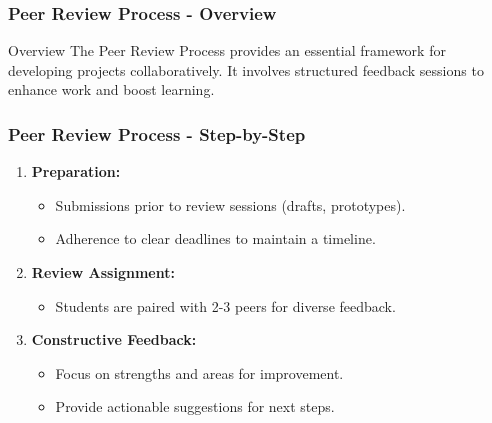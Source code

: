 \documentclass[aspectratio=169]{beamer}
\begin{document}
\begin{frame}[fragile]
    \frametitle{Peer Review Process - Overview}
    \begin{block}{Overview}
        The Peer Review Process provides an essential framework for developing projects collaboratively. 
        It involves structured feedback sessions to enhance work and boost learning.
    \end{block}
\end{frame}

\begin{frame}[fragile]
    \frametitle{Peer Review Process - Step-by-Step}
    \begin{enumerate}
        \item \textbf{Preparation:}
        \begin{itemize}
            \item Submissions prior to review sessions (drafts, prototypes).
            \item Adherence to clear deadlines to maintain a timeline.
        \end{itemize}
        
        \item \textbf{Review Assignment:}
        \begin{itemize}
            \item Students are paired with 2-3 peers for diverse feedback.
        \end{itemize}
        
        \item \textbf{Constructive Feedback:}
        \begin{itemize}
            \item Focus on strengths and areas for improvement.
            \item Provide actionable suggestions for next steps.
        \end{itemize}
    \end{enumerate}
\end{frame}
\end{document}
